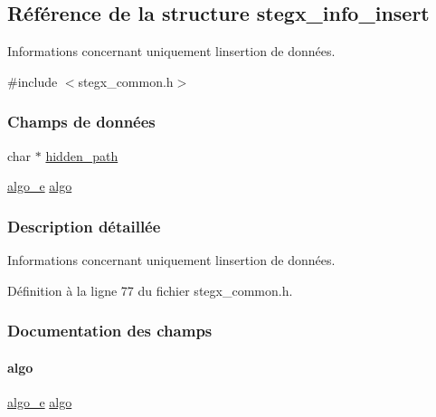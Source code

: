 \hypertarget{a00138}{}\subsection{Référence de la structure stegx\+\_\+info\+\_\+insert}
\label{a00138}


Informations concernant uniquement l\textquotesingle{}insertion de données.  




{\ttfamily \#include $<$stegx\+\_\+common.\+h$>$}

\subsubsection*{Champs de données}
\begin{DoxyCompactItemize}
\item 
char $\ast$ \hyperlink{a00138_a3a7e3d981f2b6994d925e38f221f79cc}{hidden\+\_\+path}
\item 
\hyperlink{a00008_adbe3e383e3f1c4239b26ccae2865aa06}{algo\+\_\+e} \hyperlink{a00138_aa6ad0a3fe5b1489edc6684da68c3b588}{algo}
\end{DoxyCompactItemize}


\subsubsection{Description détaillée}
Informations concernant uniquement l\textquotesingle{}insertion de données. 

Définition à la ligne 77 du fichier stegx\+\_\+common.\+h.



\subsubsection{Documentation des champs}
\mbox{\label{a00138_aa6ad0a3fe5b1489edc6684da68c3b588}} 
\paragraph{\texorpdfstring{algo}{algo}}
{\footnotesize\ttfamily \hyperlink{a00008_adbe3e383e3f1c4239b26ccae2865aa06}{algo\+\_\+e} \hyperlink{a00008_ad3066b71c7c05f99ce6c3bd88da7ac23}{algo}}

